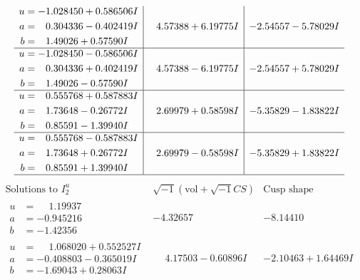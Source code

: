 \documentclass[1p]{elsarticle_modified}
\theoremstyle{definition}
\newcommand{\I}{\sqrt{-1}}
\begin{document}
$$\begin{array}{c|c|c}
\begin{aligned}
u &= -1.028450 + 0.586506 I \\
a &= \phantom{-}0.304336 - 0.402419 I \\
b &= \phantom{-}1.49026 + 0.57590 I\end{aligned}
 & \phantom{-}4.57388 + 6.19775 I & -2.54557 - 5.78029 I \\ \hline\begin{aligned}
u &= -1.028450 - 0.586506 I \\
a &= \phantom{-}0.304336 + 0.402419 I \\
b &= \phantom{-}1.49026 - 0.57590 I\end{aligned}
 & \phantom{-}4.57388 - 6.19775 I & -2.54557 + 5.78029 I \\ \hline\begin{aligned}
u &= \phantom{-}0.555768 + 0.587883 I \\
a &= \phantom{-}1.73648 - 0.26772 I \\
b &= \phantom{-}0.85591 - 1.39940 I\end{aligned}
 & \phantom{-}2.69979 + 0.58598 I & -5.35829 - 1.83822 I \\ \hline\begin{aligned}
u &= \phantom{-}0.555768 - 0.587883 I \\
a &= \phantom{-}1.73648 + 0.26772 I \\
b &= \phantom{-}0.85591 + 1.39940 I\end{aligned}
 & \phantom{-}2.69979 - 0.58598 I & -5.35829 + 1.83822 I\\
 \hline 
 \end{array}$$\newpage$$\begin{array}{c|c|c}  
\text{Solutions to }I^u_{2}& \I (\text{vol} + \sqrt{-1}CS) & \text{Cusp shape}\\
 \hline 
\begin{aligned}
u &= \phantom{-}1.19937\phantom{ +0.000000I} \\
a &= -0.945216\phantom{ +0.000000I} \\
b &= -1.42356\phantom{ +0.000000I}\end{aligned}
 & -4.32657\phantom{ +0.000000I} & -8.14410\phantom{ +0.000000I} \\ \hline\begin{aligned}
u &= \phantom{-}1.068020 + 0.552527 I \\
a &= -0.408803 - 0.365019 I \\
b &= -1.69043 + 0.28063 I\end{aligned}
 & \phantom{-}4.17503 - 0.60896 I & -2.10463 + 1.64469 I \\ \hline\begin{aligned}

\end{aligned}
\end{array}$$
\end{document}
